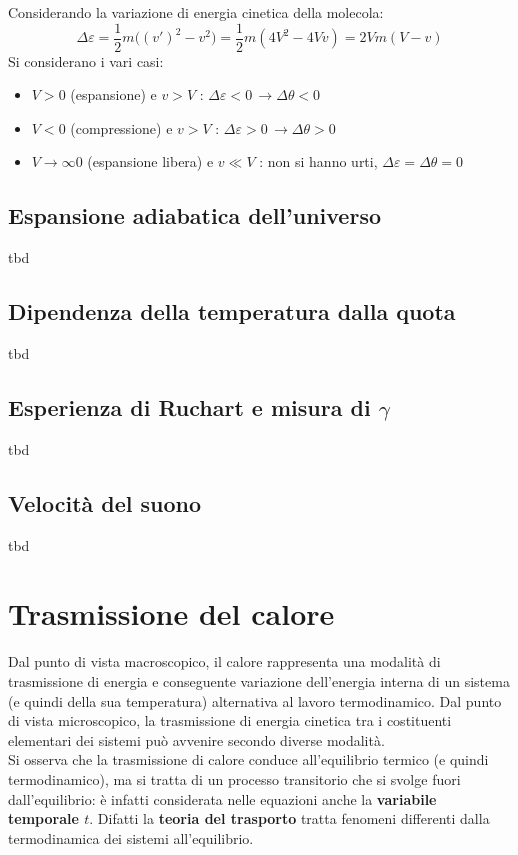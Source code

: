 \documentclass[10pt, oneside]{book}
\begin{document}
{Considerando la variazione di energia cinetica della molecola: 
\[\Delta \varepsilon = \frac{1}{2}m \big((v')^2 - v^2\big) = \frac{1}{2}m(4V^2 - 4Vv) = 2Vm(V-v)\]
Si considerano i vari casi:
\begin{itemize}
\item $V > 0$ (espansione) e $v > V$ : $\Delta \varepsilon < 0 \, \rightarrow \Delta \theta < 0$
\item $V < 0$ (compressione) e $v > V$ : $\Delta \varepsilon > 0 \, \rightarrow \Delta \theta > 0$
\item $V \rightarrow \infty 0$ (espansione libera) e $v \ll V$ : non si hanno urti, $\Delta \varepsilon = \Delta \theta = 0$ 
\end{itemize}
}

\section{Espansione adiabatica dell'universo}
tbd
\section{Dipendenza della temperatura dalla quota}
tbd
\section{Esperienza di Ruchart e misura di $\gamma$}
tbd
\section{Velocità del suono}
tbd

\chapter{Trasmissione del calore}
Dal punto di vista macroscopico, il calore rappresenta una modalità di trasmissione di energia e conseguente variazione dell'energia interna di un sistema (e quindi della sua temperatura) alternativa al lavoro termodinamico. Dal punto di vista microscopico, la trasmissione di energia cinetica tra i costituenti elementari dei sistemi può avvenire secondo diverse modalità.\\
Si osserva che la trasmissione di calore conduce all'equilibrio termico (e quindi termodinamico), ma si tratta di un processo transitorio che si svolge fuori dall'equilibrio: è infatti considerata nelle equazioni anche la \textbf{variabile temporale $t$}. Difatti la \textbf{teoria del trasporto} tratta fenomeni differenti dalla termodinamica dei sistemi all'equilibrio.
\end{document}
